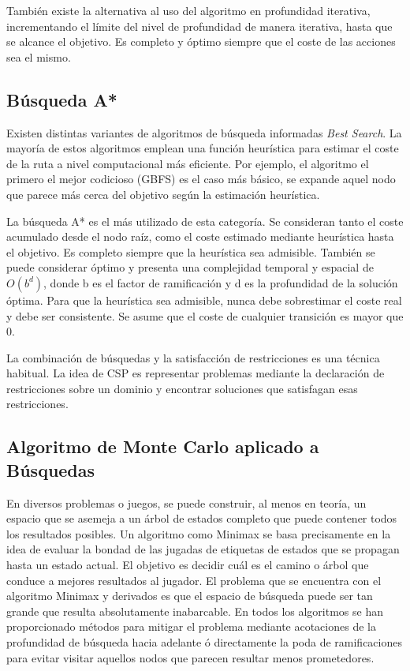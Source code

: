 \documentclass[11pt,a4paper,spanish]{book}
\numberwithin{equation}{chapter}
\numberwithin{figure}{chapter}
\begin{document}
También existe la alternativa al uso del algoritmo en profundidad iterativa, incrementando el límite del nivel de 
profundidad de manera iterativa, hasta que se alcance el objetivo. Es completo y óptimo siempre que el coste de las acciones sea el mismo.

\subsection{Búsqueda A*}

Existen distintas variantes de algoritmos de búsqueda informadas \textit{Best Search}. La mayoría de estos algoritmos emplean una función heurística para estimar el coste de la ruta
a nivel computacional más eficiente. Por ejemplo, el algoritmo el primero el mejor codicioso (GBFS) es el caso más básico, se expande aquel nodo que parece más cerca del objetivo según
la estimación heurística.

La búsqueda A* es el más utilizado de esta categoría. Se consideran tanto el coste acumulado desde el nodo raíz, como el coste estimado mediante heurística hasta el objetivo. Es 
completo siempre que la heurística sea admisible. También se puede considerar óptimo y presenta una complejidad temporal y espacial de $O(b^d)$, donde b es el factor de ramificación y d es la 
profundidad de la solución óptima. Para que la heurística sea admisible, nunca debe sobrestimar el coste real y debe ser consistente. Se asume que el coste de cualquier transición es mayor
que 0.

La combinación de búsquedas y la satisfacción de restricciones es una técnica habitual. La idea de CSP es representar problemas mediante la declaración de restricciones sobre
un dominio y encontrar soluciones que satisfagan esas restricciones.

\subsection{Algoritmo de Monte Carlo aplicado a Búsquedas}

En diversos problemas o juegos, se puede construir, al menos en teoría, un espacio que se asemeja a un árbol de estados completo que puede contener
todos los resultados posibles. Un algoritmo como Minimax se basa precisamente en la idea de evaluar la bondad de las jugadas de etiquetas de estados
que se propagan hasta un estado actual. El objetivo es decidir cuál es el camino o árbol que conduce a mejores resultados al jugador. El problema
que se encuentra con el algoritmo Minimax y derivados es que el espacio de búsqueda puede ser tan grande que resulta absolutamente inabarcable. En todos
los algoritmos se han proporcionado métodos para mitigar el problema mediante acotaciones de la profundidad de búsqueda hacia adelante ó directamente la
poda de ramificaciones para evitar visitar aquellos nodos que parecen resultar menos prometedores.
\end{document}
